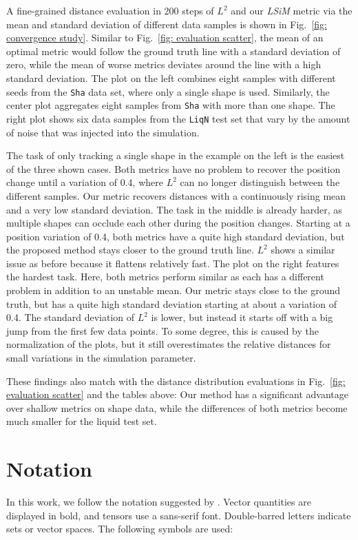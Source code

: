 A fine-grained distance evaluation in 200 steps of $L^2$ and our \textit{LSiM} metric via the mean and standard deviation of different data samples is shown in Fig.~\ref{fig: convergence study}. Similar to Fig.~\ref{fig: evaluation scatter}, the mean of an optimal metric would follow the ground truth line with a standard deviation of zero, while the mean of worse metrics deviates around the line with a high standard deviation. The plot on the left combines eight samples with different seeds from the \texttt{Sha} data set, where only a single shape is used. Similarly, the center plot aggregates eight samples from \texttt{Sha} with more than one shape. The right plot shows six data samples from the \texttt{LiqN} test set that vary by the amount of noise that was injected into the simulation.

The task of only tracking a single shape in the example on the left is the easiest of the three shown cases. Both metrics have no problem to recover the position change until a variation of 0.4, where $L^2$ can no longer distinguish between the different samples. Our metric recovers distances with a continuously rising mean and a very low standard deviation. The task in the middle is already harder, as multiple shapes can occlude each other during the position changes. Starting at a position variation of 0.4, both metrics have a quite high standard deviation, but the proposed method stays closer to the ground truth line. $L^2$ shows a similar issue as before because it flattens relatively fast. The plot on the right features the hardest task. Here, both metrics perform similar as each has a different problem in addition to an unstable mean. Our metric stays close to the ground truth, but has a quite high standard deviation starting at about a variation of 0.4. The standard deviation of $L^2$ is lower, but instead it starts off with a big jump from the first few data points. To some degree, this is caused by the normalization of the plots, but it still overestimates the relative distances for small variations in the simulation parameter.

These findings also match with the distance distribution evaluations in Fig.~\ref{fig: evaluation scatter} and the tables above: Our method has a significant advantage over shallow metrics on shape data, while the differences of both metrics become much smaller for the liquid test set.


\section{Notation} \label{append: notation}
In this work, we follow the notation suggested by \citeauthor{goodfellow2016}. Vector quantities are displayed in bold, and tensors use a sans-serif font. Double-barred letters indicate sets or vector spaces. The following symbols are used:

